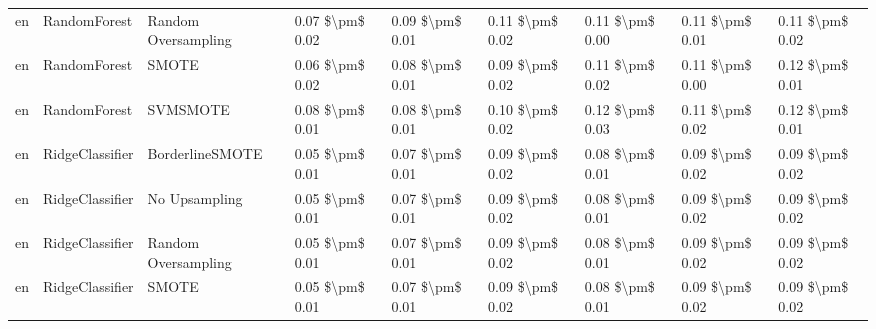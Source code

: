 \begin{tabular}{lllllllll}
      en &                    RandomForest &           Random Oversampling & 0.07 \$\textbackslash pm\$ 0.02 &           0.09 \$\textbackslash pm\$ 0.01 &       0.11 \$\textbackslash pm\$ 0.02 &        0.11 \$\textbackslash pm\$ 0.00 &                         0.11 \$\textbackslash pm\$ 0.01 &     0.11 \$\textbackslash pm\$ 0.02 \\
      en &                    RandomForest &                         SMOTE & 0.06 \$\textbackslash pm\$ 0.02 &           0.08 \$\textbackslash pm\$ 0.01 &       0.09 \$\textbackslash pm\$ 0.02 &        0.11 \$\textbackslash pm\$ 0.02 &                         0.11 \$\textbackslash pm\$ 0.00 &     0.12 \$\textbackslash pm\$ 0.01 \\
      en &                    RandomForest &                      SVMSMOTE & 0.08 \$\textbackslash pm\$ 0.01 &           0.08 \$\textbackslash pm\$ 0.01 &       0.10 \$\textbackslash pm\$ 0.02 &        0.12 \$\textbackslash pm\$ 0.03 &                         0.11 \$\textbackslash pm\$ 0.02 &     0.12 \$\textbackslash pm\$ 0.01 \\
      en &                 RidgeClassifier &               BorderlineSMOTE & 0.05 \$\textbackslash pm\$ 0.01 &           0.07 \$\textbackslash pm\$ 0.01 &       0.09 \$\textbackslash pm\$ 0.02 &        0.08 \$\textbackslash pm\$ 0.01 &                         0.09 \$\textbackslash pm\$ 0.02 &     0.09 \$\textbackslash pm\$ 0.02 \\
      en &                 RidgeClassifier &                 No Upsampling & 0.05 \$\textbackslash pm\$ 0.01 &           0.07 \$\textbackslash pm\$ 0.01 &       0.09 \$\textbackslash pm\$ 0.02 &        0.08 \$\textbackslash pm\$ 0.01 &                         0.09 \$\textbackslash pm\$ 0.02 &     0.09 \$\textbackslash pm\$ 0.02 \\
      en &                 RidgeClassifier &           Random Oversampling & 0.05 \$\textbackslash pm\$ 0.01 &           0.07 \$\textbackslash pm\$ 0.01 &       0.09 \$\textbackslash pm\$ 0.02 &        0.08 \$\textbackslash pm\$ 0.01 &                         0.09 \$\textbackslash pm\$ 0.02 &     0.09 \$\textbackslash pm\$ 0.02 \\
      en &                 RidgeClassifier &                         SMOTE & 0.05 \$\textbackslash pm\$ 0.01 &           0.07 \$\textbackslash pm\$ 0.01 &       0.09 \$\textbackslash pm\$ 0.02 &        0.08 \$\textbackslash pm\$ 0.01 &                         0.09 \$\textbackslash pm\$ 0.02 &     0.09 \$\textbackslash pm\$ 0.02 \\

\end{tabular}
